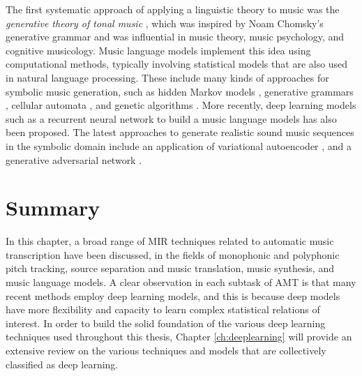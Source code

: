 The first systematic approach of applying a linguistic theory to music was the \emph{generative theory of tonal music} \cite{lerdahl1983gttm}, which was inspired by Noam Chomsky's generative grammar \cite{chomsky1966generative} and was influential in music theory, music psychology, and cognitive musicology.
Music language models implement this idea using computational methods, typically involving statistical models that are also used in natural language processing.
These include many kinds of approaches for symbolic music generation, such as hidden Markov models \cite{farbood2001markov}, generative grammars \cite{chemilier2001grammar}, cellular automata \cite{burraston2004automata}, and genetic algorithms \cite{miranda2007evolutionary}.
More recently, deep learning models such as a recurrent neural network to build a music language models \cite{sigtia2014lm} has also been proposed.
The latest approaches to generate realistic sound music sequences in the symbolic domain include an application of variational autoencoder \cite{teng2017generating,tikhonov2017generation}, and a generative adversarial network \cite{yang2017midinet}.

\section{Summary}

In this chapter, a broad range of MIR techniques related to automatic music transcription have been discussed, in the fields of monophonic and polyphonic pitch tracking, source separation and music translation, music synthesis, and music language models.
A clear observation in each subtask of AMT is that many recent methods employ deep learning models, and this is because deep models have more flexibility and capacity to learn complex statistical relations of interest.
In order to build the solid foundation of the various deep learning techniques used throughout this thesis, Chapter \ref{ch:deeplearning} will provide an extensive review on the various techniques and models that are collectively classified as deep learning.